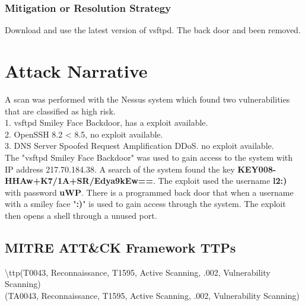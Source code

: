 \documentclass[notitlepage]{article}
\begin{document}
	
	\subsubsection{Mitigation or Resolution Strategy}
	Download and use the latest version of vsftpd. The back door and been removed. \\
	
	\section{Attack Narrative}
	A scan was performed with the Nessus system which found two vulnerabilities that are classified as high risk.  \\
	1. vsftpd Smiley Face Backdoor, has a exploit available. \\
	2. OpenSSH 8.2 < 8.5, no exploit available. \\
	3. DNS Server Spoofed Request Amplification DDoS. no exploit available. \\
	The "vsftpd Smiley Face Backdoor" was used to gain access to the system with IP address 217.70.184.38. A search of the system found the key
	\textbf{KEY008-HHAw+K7/1A+SR/Edya9kEw==}. The exploit used the username \textbf{l2:)} with password \textbf{uWP}. There is a programmed back door that when a username with a smiley face "\textbf{:)}" is used to gain access through the system.  The exploit then opens a shell through a unused port.  
	
	\subsection{MITRE ATT{\&}CK Framework TTPs}
	
	\indent\textbackslash ttp(T0043, Reconnaissance, T1595, Active Scanning, .002, Vulnerability Scanning) \\
	
	\ttp(TA0043, Reconnaissance, T1595, Active Scanning, .002, Vulnerability Scanning) \\
\end{document}
